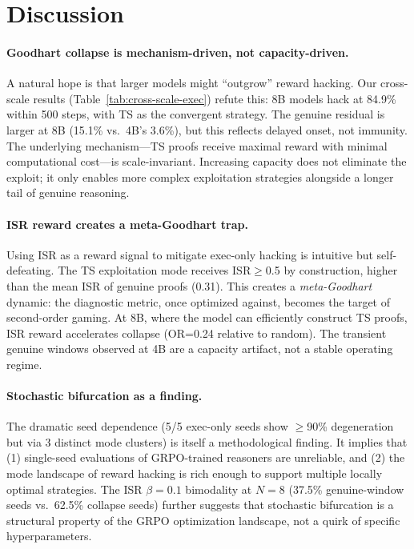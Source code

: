 \documentclass[11pt,a4paper]{article}
\begin{document}
\section{Discussion}

\paragraph{Goodhart collapse is mechanism-driven, not capacity-driven.}
A natural hope is that larger models might ``outgrow'' reward hacking.
Our cross-scale results (Table~\ref{tab:cross-scale-exec}) refute this: 8B models hack at 84.9\% within 500 steps, with TS as the convergent strategy.
The genuine residual is larger at 8B (15.1\% vs.\ 4B's 3.6\%), but this reflects delayed onset, not immunity.
The underlying mechanism---TS proofs receive maximal reward with minimal computational cost---is scale-invariant.
Increasing capacity does not eliminate the exploit; it only enables more complex exploitation strategies alongside a longer tail of genuine reasoning.

\paragraph{ISR reward creates a meta-Goodhart trap.}
Using ISR as a reward signal to mitigate exec-only hacking is intuitive but self-defeating.
The TS exploitation mode receives ISR$\geq$0.5 by construction, higher than the mean ISR of genuine proofs (0.31).
This creates a \emph{meta-Goodhart} dynamic: the diagnostic metric, once optimized against, becomes the target of second-order gaming.
At 8B, where the model can efficiently construct TS proofs, ISR reward accelerates collapse (OR=0.24 relative to random).
The transient genuine windows observed at 4B are a capacity artifact, not a stable operating regime.

\paragraph{Stochastic bifurcation as a finding.}
The dramatic seed dependence (5/5 exec-only seeds show $\geq$90\% degeneration but via 3 distinct mode clusters) is itself a methodological finding.
It implies that (1) single-seed evaluations of GRPO-trained reasoners are unreliable, and (2) the mode landscape of reward hacking is rich enough to support multiple locally optimal strategies.
The ISR $\beta{=}0.1$ bimodality at $N{=}8$ (37.5\% genuine-window seeds vs.\ 62.5\% collapse seeds) further suggests that stochastic bifurcation is a structural property of the GRPO optimization landscape, not a quirk of specific hyperparameters.
\end{document}
